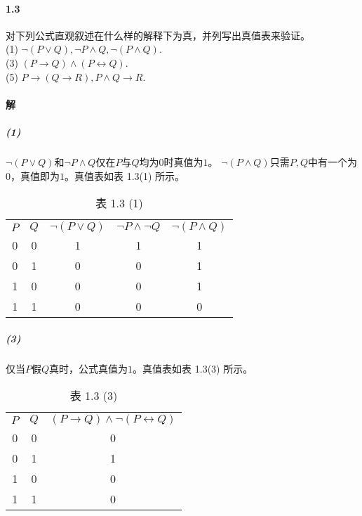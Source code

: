 \documentclass[hyperref, UTF8]{ctexart}
\begin{document}
\paragraph{1.3}\label{1.3}
对下列公式直观叙述在什么样的解释下为真，并列写出真值表来验证。\\

\quad (1) $ \lnot (P \lor Q), \lnot P \land Q, \lnot (P \land Q). $ \\

\quad (3) $ (P \to Q) \land (P \leftrightarrow Q). $ \\

\quad (5) $ P \to (Q \to R), P \land Q \to R.$ \\

\paragraph{解} 
\subparagraph{(1)}
$\lnot (P \lor Q)$和$ \lnot P \land Q$仅在$P$与$Q$均为$0$时真值为$1$。
$\lnot (P \land Q)$只需$P, Q$中有一个为$0$，真值即为$1$。真值表如表 1.3(1) 所示。
\begin{table}[!htb]
\centering
\begin{tabular}{ccccc}
$P$ & $Q$ & $\lnot(P \lor Q)$ & $\lnot P \land \lnot Q$ & $\lnot (P \land Q)$ \\
0 & 0 & 1                 & 1                       & 1                                               \\
0 & 1 & 0                 & 0                       & 1                                               \\
1 & 0 & 0                 & 0                       & 1                                               \\
1 & 1 & 0                 & 0                       & 0
\end{tabular}
\caption*{表 1.3 (1)}
\end{table}

\subparagraph{(3)}仅当$P$假$Q$真时，公式真值为$1$。真值表如表 1.3(3) 所示。
\begin{table}[!htb]
\centering
\begin{tabular}{ccc}
$P$ & $Q$ & $(P\to Q)\land \lnot (P \leftrightarrow Q)$ \\
0 & 0 & 0                                           \\
0 & 1 & 1                                           \\
1 & 0 & 0                                           \\
1 & 1 & 0
\end{tabular}
\caption*{表 1.3 (3)}
\end{table}
\end{document}
